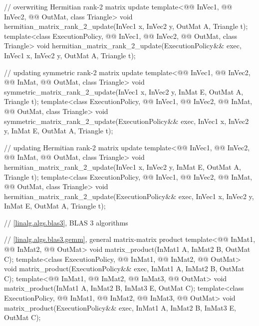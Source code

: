 \begin{codeblock}
{  // overwriting Hermitian rank-2 matrix update
  template<@@ InVec1, @@ InVec2,
           @@ OutMat, class Triangle>
    void hermitian_matrix_rank_2_update(InVec1 x, InVec2 y, OutMat A, Triangle t);
  template<class ExecutionPolicy, @@ InVec1, @@ InVec2,
           @@ OutMat, class Triangle>
    void hermitian_matrix_rank_2_update(ExecutionPolicy&& exec,
                                        InVec1 x, InVec2 y, OutMat A, Triangle t);

  // updating symmetric rank-2 matrix update
  template<@@ InVec1, @@ InVec2,
           @@ InMat,
           @@ OutMat, class Triangle>
    void symmetric_matrix_rank_2_update(InVec1 x, InVec2 y, InMat E, OutMat A, Triangle t);
  template<class ExecutionPolicy, @@ InVec1, @@ InVec2,
           @@ InMat,
           @@ OutMat, class Triangle>
    void symmetric_matrix_rank_2_update(ExecutionPolicy&& exec,
                                        InVec1 x, InVec2 y, InMat E, OutMat A, Triangle t);

  // updating Hermitian rank-2 matrix update
  template<@@ InVec1, @@ InVec2,
           @@ InMat,
           @@ OutMat, class Triangle>
    void hermitian_matrix_rank_2_update(InVec1 x, InVec2 y, InMat E, OutMat A, Triangle t);
  template<class ExecutionPolicy, @@ InVec1, @@ InVec2,
           @@ InMat,
           @@ OutMat, class Triangle>
    void hermitian_matrix_rank_2_update(ExecutionPolicy&& exec,
                                        InVec1 x, InVec2 y, InMat E, OutMat A, Triangle t);

  // \ref{linalg.algs.blas3}, BLAS 3 algorithms

  // \ref{linalg.algs.blas3.gemm}, general matrix-matrix product
  template<@@ InMat1, @@ InMat2, @@ OutMat>
    void matrix_product(InMat1 A, InMat2 B, OutMat C);
  template<class ExecutionPolicy, @@ InMat1, @@ InMat2, @@ OutMat>
    void matrix_product(ExecutionPolicy&& exec,
                        InMat1 A, InMat2 B, OutMat C);
  template<@@ InMat1, @@ InMat2, @@ InMat3, @@ OutMat>
    void matrix_product(InMat1 A, InMat2 B, InMat3 E, OutMat C);
  template<class ExecutionPolicy,
           @@ InMat1, @@ InMat2, @@ InMat3, @@ OutMat>
    void matrix_product(ExecutionPolicy&& exec,
                        InMat1 A, InMat2 B, InMat3 E, OutMat C);

}
\end{codeblock}
